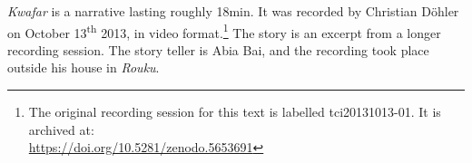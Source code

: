 \textit{Kwafar} is a narrative lasting roughly 18min. It was recorded by Christian Döhler on October 13\textsuperscript{th} 2013, in video format.\footnote{The original recording session for this text is labelled tci20131013-01. It is archived at:\\ \href{https://doi.org/10.5281/zenodo.5653691}{https://doi.org/10.5281/zenodo.5653691}} The story is an excerpt from a longer recording session. The story teller is Abia Bai, and the recording took place outside his house in \textit{Rouku}.
